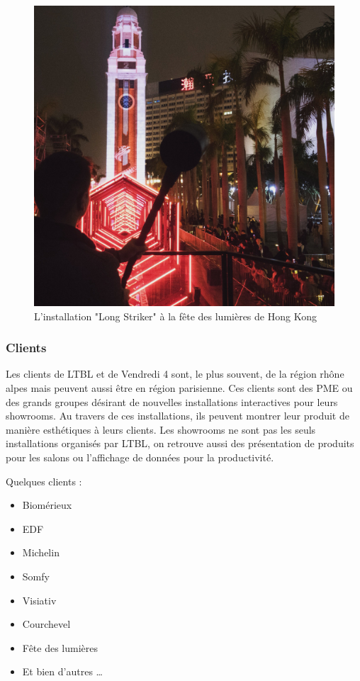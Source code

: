 \documentclass{article}
\begin{document}
\begin{figure}[h]
    \centering
    \includegraphics[scale=0.15]{long-striker.jpg}
    \caption{L'installation "Long Striker" à la fête des lumières de Hong Kong}
\end{figure}

\clearpage

\subsubsection{Clients}

Les clients de LTBL et de Vendredi 4 sont, le plus souvent, de la région rhône alpes mais peuvent aussi être en région parisienne.
Ces clients sont des PME ou des grands groupes désirant de nouvelles installations interactives pour leurs showrooms.
Au travers de ces installations, ils peuvent montrer leur produit de manière esthétiques à leurs clients.
Les showrooms ne sont pas les seuls installations organisés par LTBL, on retrouve aussi des présentation de produits pour les salons ou l'affichage de données pour la productivité.

\medskip

Quelques clients :

\begin{itemize}
    \item Biomérieux
    \item EDF
    \item Michelin
    \item Somfy
    \item Visiativ
    \item Courchevel
    \item Fête des lumières
    \item Et bien d'autres \ldots
\end{itemize}
\end{document}
